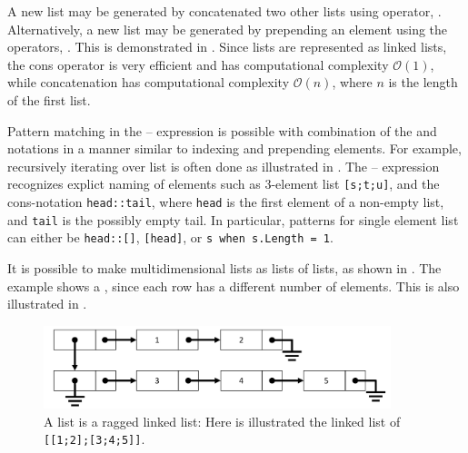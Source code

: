 \documentclass[fsharpNotes.tex]{subfiles}
\begin{document}
A new list may be generated by concatenated two other lists using  operator, . Alternatively, a new list may be generated by prepending an element using the  operators,  \idx[::@\lstinline{::}]{\lexeme{::}}. This is demonstrated in .
%
%
Since lists are represented as linked lists, the cons operator is very efficient and has computational complexity $\mathcal{O}(1)$, while concatenation has computational complexity $\mathcal{O}(n)$, where $n$ is the length of the first list.

Pattern matching in the -- expression is possible with combination of the \lexeme{[]} and \lexeme{::} notations in a manner similar to indexing and prepending elements. For example, recursively iterating over list is often done as illustrated in .
%
%
The -- expression recognizes explict naming of elements such as 3-element list \lstinline{[s;t;u]}, and the cons-notation \lstinline{head::tail}, where \lstinline{head} is the first element of a non-empty list, and \lstinline{tail} is the possibly empty tail. In particular, patterns for single element list can either be \lstinline{head::[]}, \lstinline{[head]}, or \lstinline{s when s.Length = 1}.

It is possible to make multidimensional lists as lists of lists, as shown in . 
%
%
The example shows a , since each row has a different number of elements. This is also illustrated in .
\begin{figure}
  \centering
  \includegraphics[width=0.9\textwidth]{raggedLinkedList}
  \caption{A list is a ragged linked list: Here is illustrated the linked list of \mbox{\lstinline![[1;2];[3;4;5]]!}.}
  \label{fig:raggedLinkedList}
\end{figure}
\end{document}
